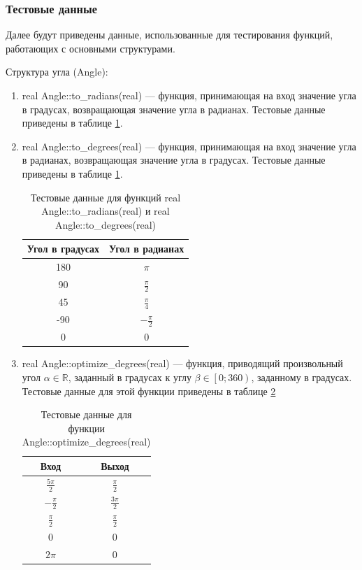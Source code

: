 \subsubsection{Тестовые данные}
Далее будут приведены данные, использованные для тестирования функций, работающих с основными структурами.

Структура угла (Angle):
\begin{enumerate}
	\item real Angle::to\_radians(real) --- функция, принимающая на вход значение угла в градусах, возвращающая значение угла в радианах. Тестовые данные приведены в таблице \ref{tbl:to_radians}.
	\item real Angle::to\_degrees(real) --- функция, принимающая на вход значение угла в радианах, возвращающая значение угла в градусах. Тестовые данные приведены в таблице \ref{tbl:to_radians}.
	\begin{table}
		\centering
		\caption{Тестовые данные для функций real Angle::to\_radians(real) и real Angle::to\_degrees(real)}
		\label{tbl:to_radians}
		\begin{tabular}{|c|c|}
			\hline
			Угол в градусах & Угол в радианах \\
			\hline
			180	& $\pi$	\\
			90	& $\frac{\pi}{2}$ \\
			45	& $\frac{\pi}{4}$ \\
			-90 & $-\frac{\pi}{2}$ \\
			0	& 0 \\
			\hline
		\end{tabular}
	\end{table}

	\item real Angle::optimize\_degrees(real) --- функция, приводящий произвольный угол $\alpha\in\mathbb{R}$, заданный в градусах к углу $\beta\in\left[0; 360\right)$, заданному в градусах. Тестовые данные для этой функции приведены в таблице \ref{tbl:optimize_radians}
	\begin{table}
		\centering
		\caption{Тестовые данные для функции Angle::optimize\_degrees(real)}
		\label{tbl:optimize_radians}
		\begin{tabular}{|c|c|}
			\hline
			Вход & Выход \\
			\hline
			$\frac{5\pi}{2}$ & $\frac{\pi}{2}$ \\
			$-\frac{\pi}{2}$ & $\frac{3\pi}{2}$	\\
			$\frac{\pi}{2}$ & $\frac{\pi}{2}$ \\
			$0$ & $0$ \\
			$2\pi$ & $0$ \\
			\hline
		\end{tabular}
	\end{table}


\end{enumerate}

